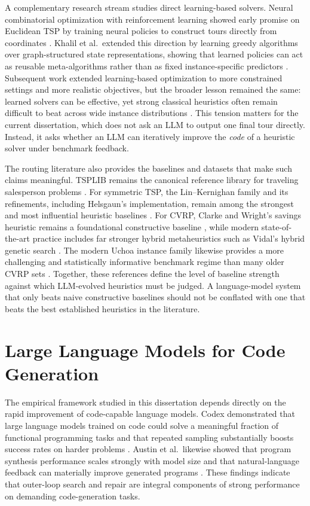 A complementary research stream studies direct learning-based solvers. Neural combinatorial
optimization with reinforcement learning showed early promise on Euclidean TSP by training neural
policies to construct tours directly from coordinates \cite{bello2016nco}. Khalil et al.\ extended
this direction by learning greedy algorithms over graph-structured state representations, showing
that learned policies can act as reusable meta-algorithms rather than as fixed instance-specific
predictors \cite{khalil2017learning}. Subsequent work extended learning-based optimization to more
constrained settings and more realistic objectives, but the broader lesson remained the same:
learned solvers can be effective, yet strong classical heuristics often remain difficult to beat
across wide instance distributions \cite{bengio2021mlco}. This tension matters for the current
dissertation, which does not ask an LLM to output one final tour directly. Instead, it asks
whether an LLM can iteratively improve the \emph{code} of a heuristic solver under benchmark
feedback.

The routing literature also provides the baselines and datasets that make such claims meaningful.
TSPLIB remains the canonical reference library for traveling salesperson problems
\cite{reinelt1991}. For symmetric TSP, the Lin--Kernighan family and its refinements, including
Helsgaun's implementation, remain among the strongest and most influential heuristic baselines
\cite{lin1973,helsgaun2000}. For CVRP, Clarke and Wright's savings heuristic remains a foundational
constructive baseline \cite{clarke1964}, while modern state-of-the-art practice includes far
stronger hybrid metaheuristics such as Vidal's hybrid genetic search \cite{vidal2022hgs}. The
modern Uchoa instance family likewise provides a more challenging and statistically informative
benchmark regime than many older CVRP sets \cite{uchoa2017}. Together, these references define the
level of baseline strength against which LLM-evolved heuristics must be judged. A language-model
system that only beats naive constructive baselines should not be conflated with one that beats
the best established heuristics in the literature.

\section{Large Language Models for Code Generation}
\label{sec:lit-codegen}

The empirical framework studied in this dissertation depends directly on the rapid improvement of
code-capable language models.
Codex demonstrated that large language models trained on code could solve a meaningful fraction of
functional programming tasks and that repeated sampling substantially boosts success rates on
harder problems \cite{chen2021codex}. Austin et al.\ likewise showed that program synthesis
performance scales strongly with model size and that natural-language feedback can materially
improve generated programs \cite{austin2021program}. These findings indicate that outer-loop search
and repair are integral components of strong performance on demanding code-generation tasks.

